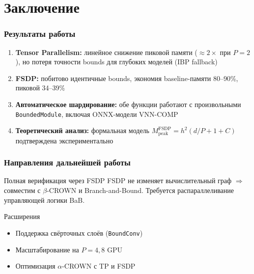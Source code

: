 
\section{Заключение}

\begin{frame}
\frametitle{Результаты работы}

\begin{enumerate}
    \item \textbf{Tensor Parallelism:} линейное снижение пиковой памяти ($\approx 2\times$ при $P{=}2$), но потеря точности bounds для глубоких моделей (IBP fallback)

    \item \textbf{FSDP:} побитово идентичные bounds, экономия baseline-памяти 80--90\%, пиковой 34--39\%

    \item \textbf{Автоматическое шардирование:} обе функции работают с произвольными \texttt{BoundedModule}, включая ONNX-модели VNN-COMP

    \item \textbf{Теоретический анализ:} формальная модель $M_{\text{peak}}^{\text{FSDP}} = h^2(d/P + 1 + C)$ подтверждена экспериментально
\end{enumerate}

\end{frame}

\begin{frame}
\frametitle{Направления дальнейшей работы}

\begin{block}{Полная верификация через FSDP}
FSDP не изменяет вычислительный граф $\Rightarrow$ совместим с $\beta$-CROWN и Branch-and-Bound. Требуется распараллеливание управляющей логики BaB.
\end{block}

\vspace{0.3cm}

\begin{block}{Расширения}
\begin{itemize}
    \item Поддержка свёрточных слоёв (\texttt{BoundConv})
    \item Масштабирование на $P = 4, 8$ GPU
    \item Оптимизация $\alpha$-CROWN с TP и FSDP
\end{itemize}
\end{block}

\end{frame}
